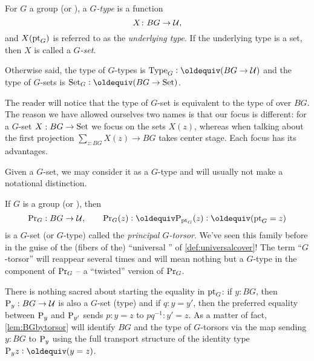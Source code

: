 \begin{definition}
  For $G$ a group (or \inftygp), a \emph{$G$-type} is a function
  $$X\colon BG\to\mathcal{U},$$
and $X({\mathord{\mathrm{pt}}}_G)$ is referred to as the \emph{underlying type}.
If the underlying type is a set, then $X$ is called a \emph{$G$-set}.

Otherwise said, the type of $G$-types is $\Type_G\defequi(BG\to\UU)$ and the type of $G$-sets is $\Set_G\defequi(BG\to\Set)$.
\end{definition}

\begin{remark}
  The reader will notice that the type of $G$-set is equivalent to the type of \coverings over $BG$.%
The reason we have allowed ourselves two names is that our focus is different: for a $G$-set $X:BG\to\mathord{\mathrm{Set}}$ we focus on the sets $X(z)$, whereas when talking about \coverings the first projection $\sum_{z:BG}X(z)\to BG$ takes center stage.  Each focus has its advantages.

Given a $G$-set, we may consider it as a $G$-type and will usually not make a notational distinction.
\end{remark}


\begin{example}\label{def:principaltorsor}
  If $G$ is a group (or \inftygp), then
$$\princ G:BG\to\UU,\qquad\princ G(z)\defequi\pathsp{\pt_G}(z)\defequi(\pt_G=z)$$ is a $G$-set (or $G$-type) called the \emph{principal $G$-torsor}.  
We've seen this family before in the guise of the (fibers of the) ``universal \covering'' of \cref{def:universalcover}!  
The term ``$G$-torsor'' will reappear several times and will mean nothing but a $G$-type in the component of $\mathrm{Pr}_{{G}}$ -- a ``twisted'' version of $\mathrm{Pr}_{{G}}$.

There is nothing sacred about starting the equality in ${\mathord{\mathrm{pt}}}_G$: if $y:BG$, then $\mathrm{P}_{y}:BG\to\mathcal{U}$ is also a $G$-set (type) and if $q:y=y'$, then the preferred equality between $\mathrm{P}_{y}$ and $\mathrm{P}_{y'}$ sends $p:y=z$ to $pq^{-1}:y'=z$.  As a matter of fact, \cref{lem:BGbytorsor} will identify $BG$ and the type of $G$-torsors via the map sending $y:BG$ to $\mathrm{P}_{y}$ using the full transport structure of the identity type $\pathsp yz\defequi(y=z)$.
 
\end{example}

